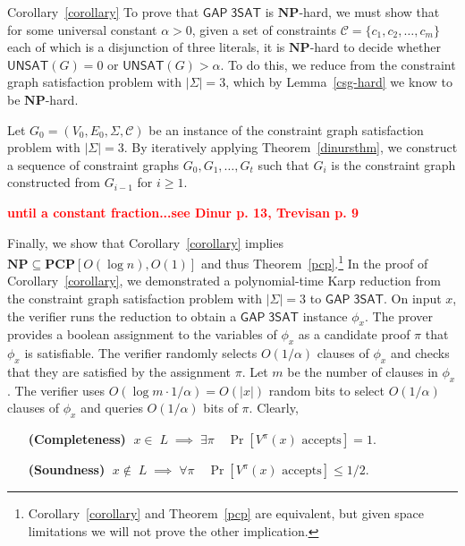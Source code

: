 \documentclass{article}
\newcommand{\fixme}[1] { \textcolor{red} {
{\fbox{ {\bf Fix:} \ensuremath{\blacktriangleright }} {\bf #1}
\fbox{\ensuremath{\blacktriangleleft} } } } }
\newenvironment{proof_of}[1]{\noindent {\bf Proof of #1:}
	\hspace*{1mm}}{\hspace*{\fill} $\Box$ }
\newcommand{\bits}{\{0,1\}}
\newcommand{\class}[1]{\mathbf{#1}}
\newcommand{\NP}{\class{NP}}
\newcommand{\PCP}{\class{PCP}}
\newcommand{\UNSAT}{\mathsf{UNSAT}}
\newcommand{\GAPSAT}{\mathsf{GAP\;3SAT}}
\begin{document}
\begin{proof_of}{Corollary~\ref{corollary}}
To prove that $\GAPSAT$ is $\NP$-hard, we must show that for some universal
constant $\alpha > 0$, given a set of constraints $\mathcal{C} = \{c_1, c_2, \dots, c_m\}$
each of which is a disjunction of three literals, it is $\NP$-hard to decide
whether $\UNSAT(G)=0$ or $\UNSAT(G)>\alpha$.
To do this, we reduce from the constraint graph satisfaction problem with
$|\Sigma| = 3$, which by Lemma~\ref{csg-hard} we know to be $\NP$-hard.

Let $G_0 = (V_0, E_0, \Sigma, \mathcal{C})$ be an instance of the constraint
graph satisfaction problem with $|\Sigma| = 3$.
By iteratively applying Theorem~\ref{dinursthm}, we construct a sequence
of constraint graphs $G_0, G_1, \dots, G_t$ such that $G_i$ is the constraint
graph constructed from $G_{i-1}$ for $i\ge 1$.

\fixme{until a constant fraction...see Dinur p. 13, Trevisan p. 9}
\end{proof_of}

Finally, we show that Corollary~\ref{corollary} implies $\NP \subseteq \PCP[O(\log n),O(1)]$
and thus Theorem~\ref{pcp}.\footnote{
Corollary~\ref{corollary} and Theorem~\ref{pcp} are equivalent, but given space limitations
we will not prove the other implication.}
In the proof of Corollary~\ref{corollary}, we demonstrated a polynomial-time
Karp reduction from the constraint graph satisfaction problem with
$|\Sigma| = 3$ to $\GAPSAT$.
On input $x$, the verifier runs the reduction  to obtain a $\GAPSAT$
instance $\phi_x$.
The prover provides %
a boolean assignment to the variables of $\phi_x$ as a candidate proof $\pi$
that $\phi_x$ is satisfiable.
The verifier randomly selects $O(1/\alpha)$ clauses of $\phi_x$ and
checks that they are satisfied by the assignment $\pi$.
Let $m$ be the number of clauses in $\phi_x$.
The verifier uses $O(\log m \cdot 1/\alpha) = O(|x|)$ random bits
to select $O(1/\alpha)$ clauses of $\phi_x$ and queries
$O(1/\alpha)$ bits of $\pi$.
Clearly,
\begin{itemize}[leftmargin=10em]
\item[\textbf{(Completeness)}] $\;x \in\; L \;\implies\; \exists \pi \quad \Pr[V^\pi(x) \text{ accepts}] = 1$.
\item[\textbf{(Soundness)}] $\;x \notin\; L \;\implies\; \forall \pi \quad \Pr[V^\pi(x) \text{ accepts}] \le 1/2$.
\end{itemize}
\end{document}
